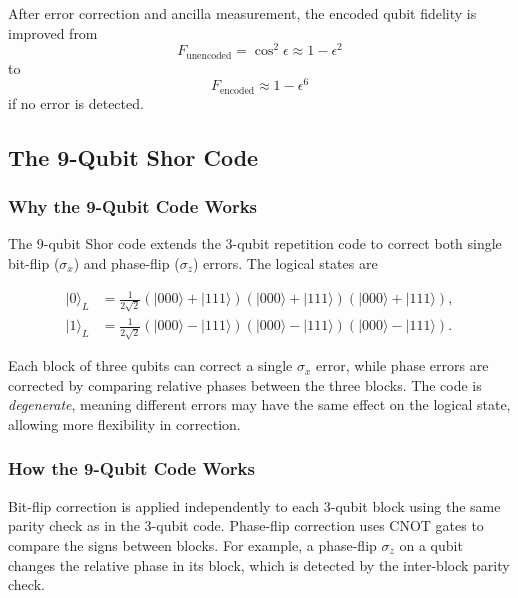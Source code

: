 \documentclass[conference]{IEEEtran}
\begin{document}
After error correction and ancilla measurement, the encoded qubit fidelity is improved from
\begin{equation}
F_{\text{unencoded}} = \cos^2 \epsilon \approx 1 - \epsilon^2
\end{equation}
to
\begin{equation}
F_{\text{encoded}} \approx 1 - \epsilon^6
\end{equation}
if no error is detected.

\subsection{The 9-Qubit Shor Code}

\subsubsection{Why the 9-Qubit Code Works}

The 9-qubit Shor code extends the 3-qubit repetition code to correct both single bit-flip ($\sigma_x$) and phase-flip ($\sigma_z$) errors. The logical states are

\begin{equation}
\begin{aligned}
|0\rangle_L &= \frac{1}{2\sqrt{2}} (|000\rangle + |111\rangle)(|000\rangle + |111\rangle)(|000\rangle + |111\rangle), \\
|1\rangle_L &= \frac{1}{2\sqrt{2}} (|000\rangle - |111\rangle)(|000\rangle - |111\rangle)(|000\rangle - |111\rangle).
\end{aligned}
\end{equation}

Each block of three qubits can correct a single $\sigma_x$ error, while phase errors are corrected by comparing relative phases between the three blocks. The code is \textit{degenerate}, meaning different errors may have the same effect on the logical state, allowing more flexibility in correction.

\subsubsection{How the 9-Qubit Code Works}

Bit-flip correction is applied independently to each 3-qubit block using the same parity check as in the 3-qubit code. Phase-flip correction uses CNOT gates to compare the signs between blocks. For example, a phase-flip $\sigma_z$ on a qubit changes the relative phase in its block, which is detected by the inter-block parity check.
\end{document}
